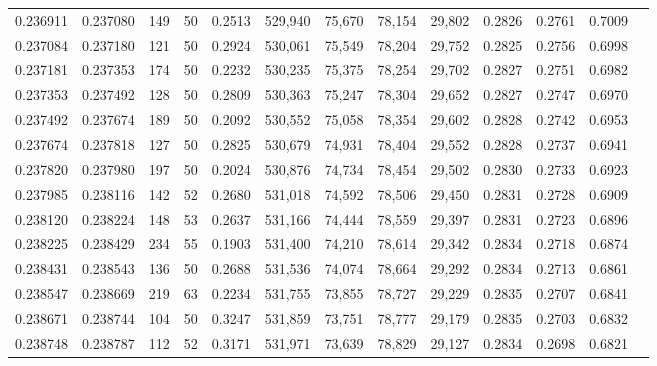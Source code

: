 \begin{tabular}{rrrrrrrrrrrrr}
0.236911 & 0.237080 &   149 &  50 &                                     0.2513 & 529,940 &  75,670 &  78,154 &  29,802 & 0.2826 & 0.2761 & 0.7009 \\
0.237084 & 0.237180 &   121 &  50 &                                     0.2924 & 530,061 &  75,549 &  78,204 &  29,752 & 0.2825 & 0.2756 & 0.6998 \\
0.237181 & 0.237353 &   174 &  50 &                                     0.2232 & 530,235 &  75,375 &  78,254 &  29,702 & 0.2827 & 0.2751 & 0.6982 \\
0.237353 & 0.237492 &   128 &  50 &                                     0.2809 & 530,363 &  75,247 &  78,304 &  29,652 & 0.2827 & 0.2747 & 0.6970 \\
0.237492 & 0.237674 &   189 &  50 &                                     0.2092 & 530,552 &  75,058 &  78,354 &  29,602 & 0.2828 & 0.2742 & 0.6953 \\
0.237674 & 0.237818 &   127 &  50 &                                     0.2825 & 530,679 &  74,931 &  78,404 &  29,552 & 0.2828 & 0.2737 & 0.6941 \\
0.237820 & 0.237980 &   197 &  50 &                                     0.2024 & 530,876 &  74,734 &  78,454 &  29,502 & 0.2830 & 0.2733 & 0.6923 \\
0.237985 & 0.238116 &   142 &  52 &                                     0.2680 & 531,018 &  74,592 &  78,506 &  29,450 & 0.2831 & 0.2728 & 0.6909 \\
0.238120 & 0.238224 &   148 &  53 &                                     0.2637 & 531,166 &  74,444 &  78,559 &  29,397 & 0.2831 & 0.2723 & 0.6896 \\
0.238225 & 0.238429 &   234 &  55 &                                     0.1903 & 531,400 &  74,210 &  78,614 &  29,342 & 0.2834 & 0.2718 & 0.6874 \\
0.238431 & 0.238543 &   136 &  50 &                                     0.2688 & 531,536 &  74,074 &  78,664 &  29,292 & 0.2834 & 0.2713 & 0.6861 \\
0.238547 & 0.238669 &   219 &  63 &                                     0.2234 & 531,755 &  73,855 &  78,727 &  29,229 & 0.2835 & 0.2707 & 0.6841 \\
0.238671 & 0.238744 &   104 &  50 &                                     0.3247 & 531,859 &  73,751 &  78,777 &  29,179 & 0.2835 & 0.2703 & 0.6832 \\
0.238748 & 0.238787 &   112 &  52 &                                     0.3171 & 531,971 &  73,639 &  78,829 &  29,127 & 0.2834 & 0.2698 & 0.6821 \\

\end{tabular}
